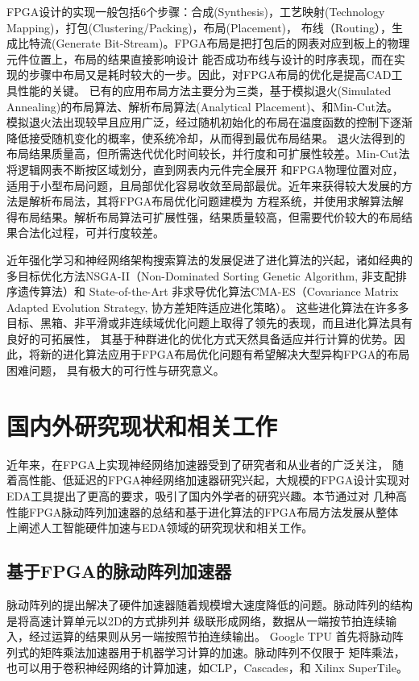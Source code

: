 FPGA设计的实现一般包括6个步骤：合成(Synthesis)，工艺映射(Technology Mapping)，打包(Clustering/Packing)，布局(Placement)，
布线（Routing），生成比特流(Generate Bit-Stream)。FPGA布局是把打包后的网表对应到板上的物理元件位置上，布局的结果直接影响设计
能否成功布线与设计的时序表现，而在实现的步骤中布局又是耗时较大的一步。因此，对FPGA布局的优化是提高CAD工具性能的关键。
已有的应用布局方法主要分为三类，基于模拟退火(Simulated Annealing)的布局算法、解析布局算法(Analytical Placement)、和Min-Cut法。
模拟退火法出现较早且应用广泛，经过随机初始化的布局在温度函数的控制下逐渐降低接受随机变化的概率，使系统冷却，从而得到最优布局结果。
退火法得到的布局结果质量高，但所需迭代优化时间较长，并行度和可扩展性较差。Min-Cut法将逻辑网表不断按区域划分，直到网表内元件完全展开
和FPGA物理位置对应，适用于小型布局问题，且局部优化容易收敛至局部最优。近年来获得较大发展的方法是解析布局法，其将FPGA布局优化问题建模为
方程系统，并使用求解算法解得布局结果。解析布局算法可扩展性强，结果质量较高，但需要代价较大的布局结果合法化过程，可并行度较差。

近年强化学习和神经网络架构搜索算法的发展促进了进化算法的兴起，诸如经典的多目标优化方法NSGA-II（Non-Dominated Sorting Genetic Algorithm, 
非支配排序遗传算法）和 State-of-the-Art 非求导优化算法CMA-ES（Covariance Matrix Adapted Evolution Strategy, 协方差矩阵适应进化策略）。
这些进化算法在许多多目标、黑箱、非平滑或非连续域优化问题上取得了领先的表现，而且进化算法具有良好的可拓展性，
其基于种群进化的优化方式天然具备适应并行计算的优势。因此，将新的进化算法应用于FPGA布局优化问题有希望解决大型异构FPGA的布局困难问题，
具有极大的可行性与研究意义。


\section{国内外研究现状和相关工作}
\label{sec:related_work}
近年来，在FPGA上实现神经网络加速器受到了研究者和从业者的广泛关注，
随着高性能、低延迟的FPGA神经网络加速器研究兴起，大规模的FPGA设计实现对
EDA工具提出了更高的要求，吸引了国内外学者的研究兴趣。本节通过对
几种高性能FPGA脉动阵列加速器的总结和基于进化算法的FPGA布局方法发展从整体
上阐述人工智能硬件加速与EDA领域的研究现状和相关工作。


\subsection{基于FPGA的脉动阵列加速器}

脉动阵列的提出解决了硬件加速器随着规模增大速度降低的问题。脉动阵列的结构是将高速计算单元以2D的方式排列并
级联形成网络，数据从一端按节拍连续输入，经过运算的结果则从另一端按照节拍连续输出。
Google TPU 首先将脉动阵列式的矩阵乘法加速器用于机器学习计算的加速。脉动阵列不仅限于
矩阵乘法，也可以用于卷积神经网络的计算加速，如CLP，Cascades，和 Xilinx SuperTile。

